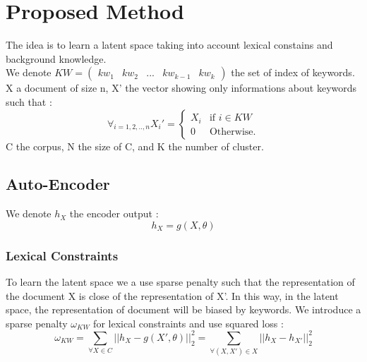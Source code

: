 \section{Proposed Method}
The idea is to learn a latent space taking into account lexical constains and
background knowledge.
\\We denote $KW = \begin{pmatrix} kw_1 & kw_2 & ... & kw_{k-1} & kw_{k}
\end {pmatrix}$
the set of index of keywords. X a document of size n,
X' the vector showing only informations about keywords such that :
\begin{equation*}
\forall_{i=1,2,..,n}X_i' = \left\{
\begin{array}{ll}
  X_i & \mbox{if } i \in KW \\
  0 & \mbox{Otherwise.}
\end{array}
\right.
\end{equation*}
C the corpus, N the size of C, and K the number of cluster.
\subsection{Auto-Encoder}
We denote $h_X$ the encoder output : 
\begin{equation}\label{eq:h}
  h_X = g(X,\theta)
\end{equation}
\subsubsection{Lexical Constraints}
To learn the latent space we a use sparse penalty such that the representation
of the document X is close of the representation of X'. In this way, in the
latent space, the representation of document will be biased by keywords.
We introduce a sparse penalty $\omega_{KW}$ for lexical constraints and
use squared loss : 
\begin{equation}\label{eq:omega1}
  \omega_{KW} = \sum_{\forall{X\in C}} || h_X - g(X',\theta) ||_2^2 =
  \sum_{\forall{(X,X')\in X}} || h_X - h_{X'}||_2^2
\end{equation}
